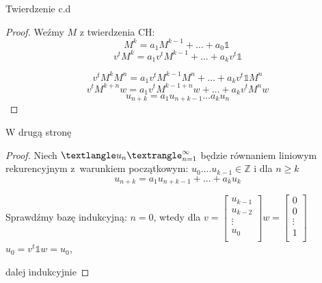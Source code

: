 \documentclass[handout]{beamer}
\theoremstyle{definition}
\theoremstyle{named}
\begin{document}
\begin{frame}{Twierdzenie c.d}

\begin{proof}
    Weźmy $M$ z twierdzenia CH: 
    \begin{equation}
        M^{k} =  a_1 M^{k-1} + \ldots + a_0 \mathbb{1} \
    \end{equation}
    \pause
    \begin{equation}
        v^{t}M^{k} = a_1 v^{t} M^{k-1} + \ldots + a_k v^{t} \mathbb{1} 
    \end{equation} 

    \pause
      \begin{equation}
          v^{t}M^{k} M^{n} = a_1 v^{t} M^{k-1} M^{n} + \ldots + a_k v^{t} \mathbb{1} M^{n}
      \end{equation}
    \pause
      \begin{equation}
          v^{t}M^{k + n} w = a_1 v^{t} M^{k-1 + n}w + \ldots + a_k v^{t} M^{n}w 
      \end{equation}
      \begin{equation}
          u_{n+k} = a_1 u_{n+k -1 } \ldots a_{k} u_{n}
      \end{equation}
\end{proof}
\end{frame}

\begin{frame}{W drugą stronę}
\begin{proof}
    Niech $\textlangle u_n \textrangle_{n=1}^{\infty}$ będzie równaniem liniowym rekurencyjnym z~warunkiem początkowym: $u_0. \ldots u_{k-1} \in \mathbb{Z}$ i dla $n \geq k$ 
    \[
    u_{n+k} = a_1 u_{n+k-1} + \ldots + a_{k} u_{k}
    \] 
    
    \pause
    Sprawdźmy bazę indukcyjną: \newline 
    $n=0$, wtedy dla $v= \begin{bmatrix}
            u_{k-1} \\ u_{k-2} \\ \vdots \\ u_{0} \\
            \end{bmatrix}
            w =  \begin{bmatrix}
            0 \\ 0 \\ \vdots \\ 1 \\
            \end{bmatrix}
        $
    \newline
    $u_{0} = v^{t} \mathbb{1} w = u_0$,
     
    \pause
    dalej indukcyjnie
    
\end{proof}
\end{frame}
\end{document}
